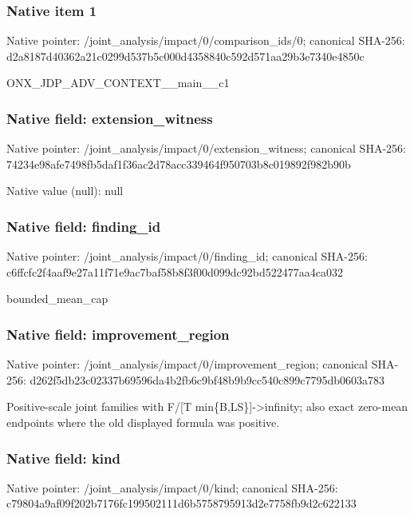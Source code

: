 \documentclass[10pt,a4paper]{article}
\begin{document}
\subsubsection{Native item 1}
Native pointer: /joint\_\allowbreak{}analysis/impact/0/comparison\_\allowbreak{}ids/0; canonical SHA-256: d2a8187d40362a21c0299d537b5c000d4358840c592d571aa29b3e7340e4850c

\begingroup\raggedright\sloppy ONX\_\allowbreak{}JDP\_\allowbreak{}ADV\_\allowbreak{}CONTEXT\_\allowbreak{}\_\allowbreak{}main\_\allowbreak{}\_\allowbreak{}c1\par\endgroup

\subsubsection{Native field: extension\_\allowbreak{}witness}
Native pointer: /joint\_\allowbreak{}analysis/impact/0/extension\_\allowbreak{}witness; canonical SHA-256: 74234e98afe7498fb5daf1f36ac2d78acc339464f950703b8c019892f982b90b

Native value (null): null

\subsubsection{Native field: finding\_\allowbreak{}id}
Native pointer: /joint\_\allowbreak{}analysis/impact/0/finding\_\allowbreak{}id; canonical SHA-256: c6ffcfc2f4aaf9e27a11f71e9ac7baf58b8f3f00d099dc92bd522477aa4ca032

\begingroup\raggedright\sloppy bounded\_\allowbreak{}mean\_\allowbreak{}cap\par\endgroup

\subsubsection{Native field: improvement\_\allowbreak{}region}
Native pointer: /joint\_\allowbreak{}analysis/impact/0/improvement\_\allowbreak{}region; canonical SHA-256: d262f5db23c02337b69596da4b2fb6c9bf48b9b9cc540c899c7795db0603a783

\begingroup\raggedright\sloppy Positive-scale joint families with F/\allowbreak{}[T min\{B,\allowbreak{}LS\}]->infinity;\allowbreak{} also exact zero-mean endpoints where the old displayed formula was positive.\par\endgroup

\subsubsection{Native field: kind}
Native pointer: /joint\_\allowbreak{}analysis/impact/0/kind; canonical SHA-256: c79804a9af09f202b7176fc199502111d6b5758795913d2e7758fb9d2c622133
\end{document}
